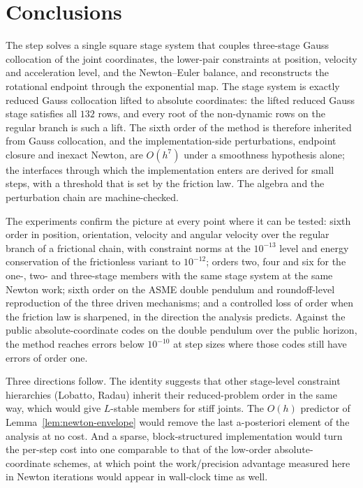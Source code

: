 \section{Conclusions}
\label{sec:conclusions}

The \method{} step solves a single square stage system that couples three-stage Gauss collocation
of the joint coordinates, the lower-pair constraints at position, velocity and acceleration level,
and the Newton--Euler balance, and reconstructs the rotational endpoint through the exponential
map. The stage system is exactly reduced Gauss collocation lifted to absolute coordinates: the
lifted reduced Gauss stage satisfies all $132$ rows, and every root of the non-dynamic rows on the
regular branch is such a lift. The sixth order of the method is therefore inherited from Gauss
collocation, and the implementation-side perturbations, endpoint closure and inexact Newton, are
$O(h^7)$ under a smoothness hypothesis alone; the interfaces through which the implementation enters
are derived for small steps, with a threshold that is set by the friction law. The algebra and the
perturbation chain are machine-checked.

The experiments confirm the picture at every point where it can be tested: sixth order in position,
orientation, velocity and angular velocity over the regular branch of a frictional chain, with
constraint norms at the $10^{-13}$ level and energy conservation of the frictionless variant to
$10^{-12}$; orders two, four and six for the one-, two- and three-stage members with the same
stage system at the same Newton work; sixth order on the ASME double pendulum and roundoff-level
reproduction of the three driven mechanisms; and a controlled loss of order when the friction law is
sharpened, in the direction the analysis predicts. Against the public absolute-coordinate codes on
the double pendulum over the public horizon, the method reaches errors below $10^{-10}$ at step
sizes where those codes still have errors of order one.

Three directions follow. The identity suggests that other stage-level constraint hierarchies
(Lobatto, Radau) inherit their reduced-problem order in the same way, which would give
$L$-stable members for stiff joints. The $O(h)$ predictor of Lemma~\ref{lem:newton-envelope}
would remove the last a-posteriori element of the analysis at no cost. And a sparse, block-structured
implementation would turn the per-step cost into one comparable to that of the low-order
absolute-coordinate schemes, at which point the work/precision advantage measured here in Newton
iterations would appear in wall-clock time as well.

